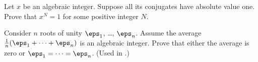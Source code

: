 \begin{problem} \yod
	Let $x$ be an algebraic integer.
	Suppose all its conjugates have absolute value one.
	Prove that $x^N=1$ for some positive integer $N$.
\end{problem}

\begin{sproblem}
	\label{prob:rep_lemma}
	Consider $n$ roots of unity $\eps_1$, \dots, $\eps_n$.
	Assume the average $\frac1n(\eps_1 + \dots + \eps_n)$ is an algebraic integer.
	Prove that either the average is zero or $\eps_1 = \dots = \eps_n$.
	(Used in .)
\end{sproblem}
